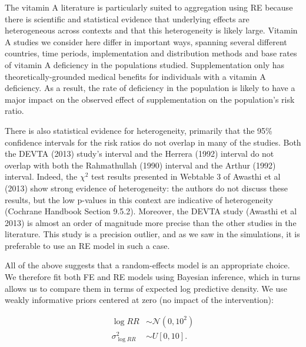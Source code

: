 \documentclass[12pt]{article}
\begin{document}
The vitamin A literature is particularly suited to aggregation using RE because there is scientific and statistical evidence that underlying effects are heterogeneous across contexts and that this heterogeneity is likely large. Vitamin A studies we consider here differ in important ways, spanning several different countries, time periods, implementation and distribution methods and base rates of vitamin A deficiency in the populations studied. Supplementation only has theoretically-grounded medical benefits for individuals with a vitamin A deficiency. As a result, the rate of deficiency in the population is likely to have a major impact on the observed effect of supplementation on the population's risk ratio. 

There is also statistical evidence for heterogeneity, primarily that the 95\% confidence intervals for the risk ratios do not overlap in many of the studies. Both the DEVTA (2013) study's interval and the Herrera (1992) interval do not overlap with both the Rahmathullah (1990) interval and the Arthur (1992) interval. Indeed, the $\chi^2$ test results presented in Webtable 3 of Awasthi et al (2013) show strong evidence of heterogeneity: the authors do not discuss these results, but the low p-values in this context are indicative of heterogeneity (Cochrane Handbook Section 9.5.2). Moreover, the DEVTA study (Awasthi et al 2013) is almost an order of magnitude more precise than the other studies in the literature. This study is a precision outlier, and as we saw in the simulations, it is preferable to use an RE model in such a case.

All of the above suggests that a random-effects model is an appropriate choice. We therefore fit both FE and RE models using Bayesian inference, which in turns allows us to compare them in terms of expected log predictive density. We use weakly informative priors centered at zero (no impact of the intervention):

\begin{equation} 
\begin{aligned}
\log{RR} &\sim  \mathcal{N}(0,10^2) \\
\sigma^2_{\log{RR}} &\sim U[0,10].
\end{aligned}
\label{lognormal priors}
\end{equation}



\end{document}
